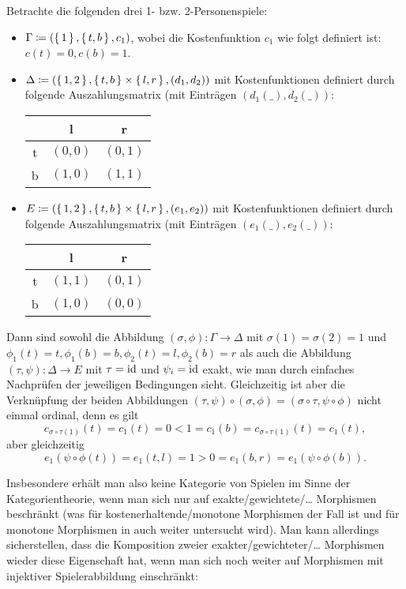 \begin{bsp}\label{bsp:GegenbspKompositionVMorphismen}
	Betrachte die folgenden drei 1- bzw. 2-Personenspiele:
	\begin{itemize}
		\item $\Gamma \coloneqq (\set{1}, \set{t, b}, c_1)$, wobei die Kostenfunktion $c_1$ wie folgt definiert ist: $c(t) = 0, c(b) = 1$.
		\item $\Delta \coloneqq (\set{1, 2}, \set{t, b} \times \set{l, r}, (d_1, d_2))$ mit Kostenfunktionen definiert durch folgende Auszahlungsmatrix (mit Einträgen $(d_1(\_), d_2(\_))$:
		\begin{center}
				\begin{tabular}{c||c|c}
					& l 		& r 		\\\hline\hline
				t	& $(0,0)$	& $(0,1)$	\\\hline
				b	& $(1,0)$	& $(1,1)$ 
			\end{tabular}
		\end{center}
		\item $E \coloneqq (\set{1, 2}, \set{t, b} \times \set{l, r}, (e_1, e_2))$ mit Kostenfunktionen definiert durch folgende Auszahlungsmatrix (mit Einträgen $(e_1(\_), e_2(\_))$:
		\begin{center}
			\begin{tabular}{c||c|c}
				& l 		& r 		\\\hline\hline
			t	& $(1,1)$	& $(0,1)$	\\\hline
			b	& $(1,0)$	& $(0,0)$ 
			\end{tabular}
		\end{center}
	\end{itemize}
	Dann sind sowohl die Abbildung $(\sigma, \phi): \Gamma \to \Delta$ mit $\sigma(1) = \sigma(2) = 1$ und $\phi_1(t) = t, \phi_1(b) = b, \phi_2(t) = l, \phi_2(b) = r$ als auch die Abbildung $(\tau, \psi): \Delta \to E$ mit $\tau = \mathrm{id}$ und $\psi_i = \mathrm{id}$ exakt, wie man durch einfaches Nachprüfen der jeweiligen Bedingungen sieht. Gleichzeitig ist aber die Verknüpfung der beiden Abbildungen $(\tau, \psi)\circ(\sigma, \phi) = (\sigma\circ\tau, \psi\circ\phi)$ nicht einmal ordinal, denn es gilt
		\[c_{\sigma\circ\tau(1)}(t) = c_1(t) = 0 < 1 = c_1(b) = c_{\sigma\circ\tau(1)}(t) = c_1(t),\]
	aber gleichzeitig
		\[e_1(\psi\circ\phi(t)) = e_1(t,l) = 1 > 0 = e_1(b,r) = e_1(\psi\circ\phi(b)).\]
\end{bsp}

Insbesondere erhält man also keine Kategorie von Spielen im Sinne der Kategorientheorie, wenn man sich nur auf exakte/gewichtete/\dots{} Morphismen beschränkt (was für kostenerhaltende/monotone Morphismen der Fall ist und für monotone Morphismen in \cite{LapGameCat} auch weiter untersucht wird). Man kann allerdings sicherstellen, dass die Komposition zweier exakter/gewichteter/\dots{} Morphismen wieder diese Eigenschaft hat, wenn man sich noch weiter auf Morphismen mit injektiver Spielerabbildung einschränkt:

